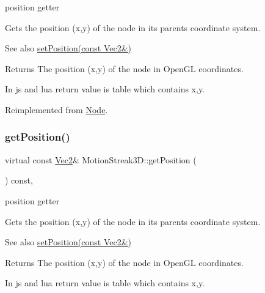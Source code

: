 position getter 

Gets the position (x,y) of the node in its parent\textquotesingle{}s coordinate system.

\begin{DoxySeeAlso}{See also}
\hyperlink{classMotionStreak3D_a8e4698c3850e094f90600e3ba4604651}{set\+Position(const Vec2\&)}
\end{DoxySeeAlso}
\begin{DoxyReturn}{Returns}
The position (x,y) of the node in Open\+GL coordinates. 
\begin{DoxyCode}
In js and lua \textcolor{keywordflow}{return} value is table which contains x,y.
\end{DoxyCode}
 
\end{DoxyReturn}


Reimplemented from \hyperlink{classNode_a1c78c6feace91b27b6cbb12ee16e8eb0}{Node}.

\mbox{\label{classMotionStreak3D_a17b236b952ac5670676b2b50a0fab421}} 
\subsubsection{\texorpdfstring{get\+Position()}{getPosition()}\hspace{0.1cm}{\footnotesize\ttfamily [2/4]}}
{\footnotesize\ttfamily virtual const \hyperlink{classVec2}{Vec2}\& Motion\+Streak3\+D\+::get\+Position (\begin{DoxyParamCaption}{ }\end{DoxyParamCaption}) const\hspace{0.3cm}{\ttfamily [override]}, {\ttfamily [virtual]}}



position getter 

Gets the position (x,y) of the node in its parent\textquotesingle{}s coordinate system.

\begin{DoxySeeAlso}{See also}
\hyperlink{classMotionStreak3D_a8e4698c3850e094f90600e3ba4604651}{set\+Position(const Vec2\&)}
\end{DoxySeeAlso}
\begin{DoxyReturn}{Returns}
The position (x,y) of the node in Open\+GL coordinates. 
\begin{DoxyCode}
In js and lua \textcolor{keywordflow}{return} value is table which contains x,y.
\end{DoxyCode}
 
\end{DoxyReturn}



